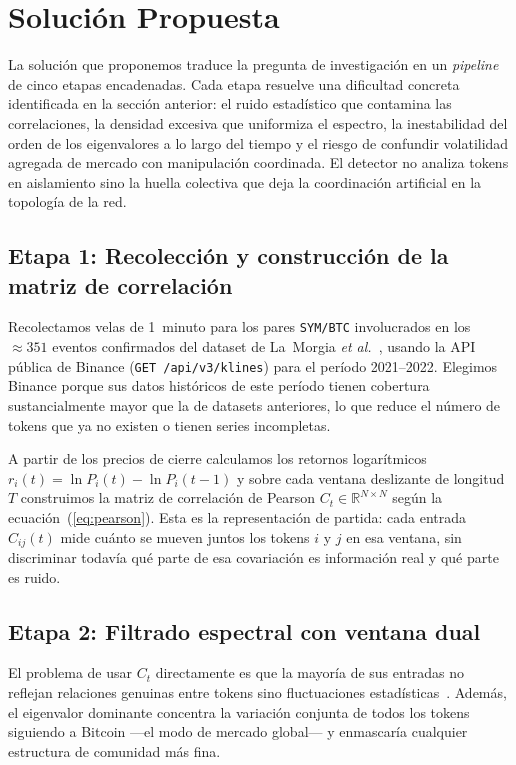 \section{Solución Propuesta}
\label{sec:solucion}

La solución que proponemos traduce la pregunta de investigación en un
\emph{pipeline} de cinco etapas encadenadas. Cada etapa resuelve una
dificultad concreta identificada en la sección anterior: el ruido
estadístico que contamina las correlaciones, la densidad excesiva que
uniformiza el espectro, la inestabilidad del orden de los eigenvalores
a lo largo del tiempo y el riesgo de confundir volatilidad agregada de
mercado con manipulación coordinada. El detector no analiza tokens en
aislamiento sino la huella colectiva que deja la coordinación artificial
en la topología de la red.

\subsection{Etapa 1: Recolección y construcción de la matriz de correlación}

Recolectamos velas de 1~minuto para los pares \texttt{SYM/BTC}
involucrados en los ${\approx}351$ eventos confirmados del dataset de
La~Morgia \textit{et al.}~\cite{lamorgia2020}, usando la API pública de
Binance (\texttt{GET /api/v3/klines}) para el período 2021--2022.
Elegimos Binance porque sus datos históricos de este período tienen
cobertura sustancialmente mayor que la de datasets anteriores, lo que
reduce el número de tokens que ya no existen o tienen series
incompletas.

A partir de los precios de cierre calculamos los retornos logarítmicos
$r_i(t) = \ln P_i(t) - \ln P_i(t-1)$ y sobre cada ventana deslizante
de longitud $T$ construimos la matriz de correlación de Pearson
$C_t \in \mathbb{R}^{N \times N}$ según la ecuación~(\ref{eq:pearson}).
Esta es la representación de partida: cada entrada $C_{ij}(t)$ mide
cuánto se mueven juntos los tokens $i$ y $j$ en esa ventana, sin
discriminar todavía qué parte de esa covariación es información real y
qué parte es ruido.

\subsection{Etapa 2: Filtrado espectral con ventana dual}

El problema de usar $C_t$ directamente es que la mayoría de sus entradas
no reflejan relaciones genuinas entre tokens sino fluctuaciones
estadísticas~\cite{plerou1999}. Además, el eigenvalor dominante
concentra la variación conjunta de todos los tokens siguiendo a
Bitcoin ---el modo de mercado global--- y enmascaría cualquier
estructura de comunidad más fina.

